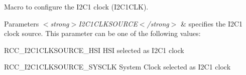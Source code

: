 Macro to configure the I2\+C1 clock (I2\+C1\+C\+LK). 


\begin{DoxyParams}{Parameters}
{\em $<$strong$>$\+I2\+C1\+C\+L\+K\+S\+O\+U\+R\+C\+E$<$/strong$>$} & specifies the I2\+C1 clock source. This parameter can be one of the following values\+: \begin{DoxyItemize}
\item R\+C\+C\+\_\+\+I2\+C1\+C\+L\+K\+S\+O\+U\+R\+C\+E\+\_\+\+H\+SI H\+SI selected as I2\+C1 clock \item R\+C\+C\+\_\+\+I2\+C1\+C\+L\+K\+S\+O\+U\+R\+C\+E\+\_\+\+S\+Y\+S\+C\+LK System Clock selected as I2\+C1 clock \end{DoxyItemize}
\\
\hline
\end{DoxyParams}
